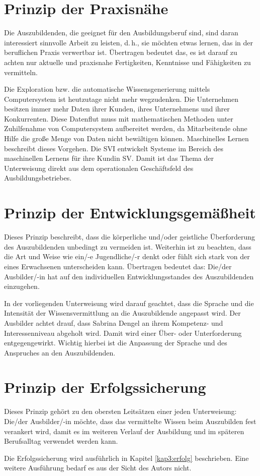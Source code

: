 \section{Prinzip der Praxisnähe}
Die Auszubildenden, die geeignet für den Ausbildungsberuf sind, sind daran interessiert sinnvolle Arbeit zu leisten, d.\,h., sie möchten etwas lernen, das in der beruflichen Praxis verwertbar ist. Übertragen bedeutet das, es ist darauf zu achten nur aktuelle und praxisnahe Fertigkeiten, Kenntnisse und Fähigkeiten zu vermitteln. 
\par
Die Exploration bzw. die automatische Wissensgenerierung mittels Computersystem ist heutzutage nicht mehr wegzudenken. Die Unternehmen besitzen immer mehr Daten ihrer Kunden, ihres Unternehmens und ihrer Konkurrenten.\autocite[vgl.][]{noauthor_hochschule_nodate}\autocite[vgl.][]{noauthor_volkswagen_nodate} Diese Datenflut muss mit mathematischen Methoden unter Zuhilfenahme von Computersystem aufbereitet werden, da Mitarbeitende ohne Hilfe die große Menge von Daten nicht bewältigen können. Maschinelles Lernen beschreibt dieses Vorgehen. Die \ac{SVI} entwickelt Systeme im Bereich des maschinellen Lernens für ihre Kundin \ac{SV}. Damit ist das Thema der Unterweisung direkt aus dem operationalen Geschäftsfeld des Ausbildungsbetriebes. 

\section{Prinzip der Entwicklungsgemäßheit}
Dieses Prinzip beschreibt, dass die körperliche und/oder geistliche Überforderung des Auszubildenden unbedingt zu vermeiden ist. Weiterhin ist zu beachten, dass die Art und Weise wie ein/-e Jugendliche/-r denkt oder fühlt sich stark von der eines Erwachsenen unterscheiden kann. Übertragen bedeutet das: Die/der Ausbilder/-in hat auf den individuellen Entwicklungsstandes des Auszubildenden einzugehen. 
\par
In der vorliegenden Unterweisung wird darauf geachtet, dass die Sprache und die Intensität der Wissensvermittlung an die Auszubildende angepasst wird. Der Ausbilder achtet drauf, dass Sabrina Dengel an ihrem Kompetenz- und Interessenniveau abgeholt wird. Damit wird einer Über- oder Unterforderung entgegengewirkt. Wichtig hierbei ist die Anpassung der Sprache und des Anspruches an den Auszubildenden.

\section{Prinzip der Erfolgssicherung}
Dieses Prinzip gehört zu den obersten Leitsätzen einer jeden Unterweisung: Die/der Ausbilder/-in möchte, dass das vermittelte Wissen beim Auszubilden fest verankert wird, damit es im weiteren Verlauf der Ausbildung und im späteren Berufsalltag verwendet werden kann. 
\par
Die Erfolgssicherung wird ausführlich in Kapitel \vref{kap3:erfolg} beschrieben. Eine weitere Ausführung bedarf es aus der Sicht des Autors nicht.

